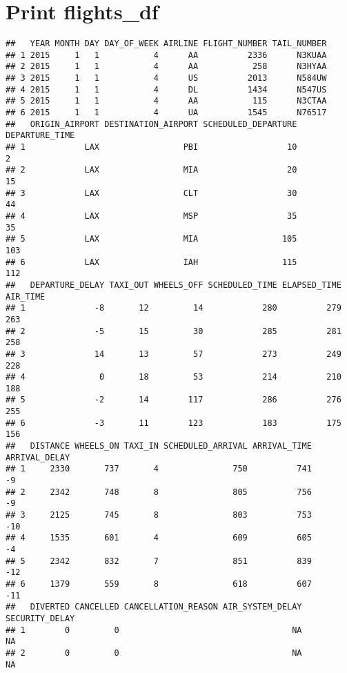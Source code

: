 \documentclass[]{article}
\begin{document}
\hypertarget{print-flights_df}{%
\section{Print flights\_df}\label{print-flights_df}}

\begin{verbatim}
##   YEAR MONTH DAY DAY_OF_WEEK AIRLINE FLIGHT_NUMBER TAIL_NUMBER
## 1 2015     1   1           4      AA          2336      N3KUAA
## 2 2015     1   1           4      AA           258      N3HYAA
## 3 2015     1   1           4      US          2013      N584UW
## 4 2015     1   1           4      DL          1434      N547US
## 5 2015     1   1           4      AA           115      N3CTAA
## 6 2015     1   1           4      UA          1545      N76517
##   ORIGIN_AIRPORT DESTINATION_AIRPORT SCHEDULED_DEPARTURE DEPARTURE_TIME
## 1            LAX                 PBI                  10              2
## 2            LAX                 MIA                  20             15
## 3            LAX                 CLT                  30             44
## 4            LAX                 MSP                  35             35
## 5            LAX                 MIA                 105            103
## 6            LAX                 IAH                 115            112
##   DEPARTURE_DELAY TAXI_OUT WHEELS_OFF SCHEDULED_TIME ELAPSED_TIME AIR_TIME
## 1              -8       12         14            280          279      263
## 2              -5       15         30            285          281      258
## 3              14       13         57            273          249      228
## 4               0       18         53            214          210      188
## 5              -2       14        117            286          276      255
## 6              -3       11        123            183          175      156
##   DISTANCE WHEELS_ON TAXI_IN SCHEDULED_ARRIVAL ARRIVAL_TIME ARRIVAL_DELAY
## 1     2330       737       4               750          741            -9
## 2     2342       748       8               805          756            -9
## 3     2125       745       8               803          753           -10
## 4     1535       601       4               609          605            -4
## 5     2342       832       7               851          839           -12
## 6     1379       559       8               618          607           -11
##   DIVERTED CANCELLED CANCELLATION_REASON AIR_SYSTEM_DELAY SECURITY_DELAY
## 1        0         0                                   NA             NA
## 2        0         0                                   NA             NA

\end{verbatim}
\end{document}
